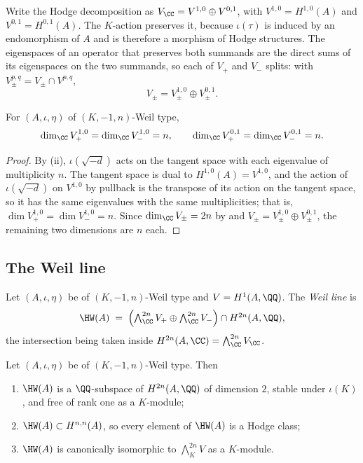 Write the Hodge decomposition as $V_{\CC}=V^{1,0}\oplus V^{0,1}$, with
$V^{1,0}=H^{1,0}(A)$ and $V^{0,1}=H^{0,1}(A)$. The $K$-action preserves it,
because $\iota(\tau)$ is induced by an endomorphism of $A$ and is therefore a
morphism of Hodge structures. The eigenspaces of an operator that preserves
both summands are the direct sums of its eigenspaces on the two summands, so
each of $V_{+}$ and $V_{-}$ splits: with $V^{p,q}_{\pm}=V_{\pm}\cap V^{p,q}$,
\begin{equation}\label{eq:bisplit}
  V_{\pm}=V_{\pm}^{1,0}\oplus V_{\pm}^{0,1}.
\end{equation}

\begin{lemma}\label{lem:balanced}
For $(A,\iota,\eta)$ of $(K,-1,n)$-Weil type,
\[
  \dim_{\CC}V_{+}^{1,0}=\dim_{\CC}V_{-}^{1,0}=n,
  \qquad
  \dim_{\CC}V_{+}^{0,1}=\dim_{\CC}V_{-}^{0,1}=n .
\]
\end{lemma}

\begin{proof}
By (ii), $\iota(\sqrt{-d})$ acts on the tangent space with
each eigenvalue of multiplicity $n$. The tangent space is dual to
$H^{1,0}(A)=V^{1,0}$, and the action of $\iota(\sqrt{-d})$ on $V^{1,0}$ by
pullback is the transpose of its action on the tangent space, so it has the
same eigenvalues with the same multiplicities; that is,
$\dim V^{1,0}_{+}=\dim V^{1,0}_{-}=n$. Since $\dim_{\CC}V_{\pm}=2n$ by
 and $V_{\pm}=V^{1,0}_{\pm}\oplus V^{0,1}_{\pm}$, the
remaining two dimensions are $n$ each.
\end{proof}

\subsection{The Weil line}

\begin{definition}\label{def:weilline}
Let $(A,\iota,\eta)$ be of $(K,-1,n)$-Weil type and $V=H^{1}(A,\QQ)$. The
\emph{Weil line} is
\[
  \HW(A)\;=\;\Bigl(\textstyle\bigwedge^{2n}_{\CC}V_{+}\oplus
  \bigwedge^{2n}_{\CC}V_{-}\Bigr)\cap H^{2n}(A,\QQ),
\]
the intersection being taken inside
$H^{2n}(A,\CC)=\bigwedge^{2n}_{\CC}V_{\CC}$.
\end{definition}

\begin{proposition}\label{prop:weilline}
Let $(A,\iota,\eta)$ be of $(K,-1,n)$-Weil type. Then
\begin{enumerate}[label=\textup{(\roman*)},nosep]
\item $\HW(A)$ is a $\QQ$-subspace of $H^{2n}(A,\QQ)$ of dimension $2$, stable
  under $\iota(K)$, and free of rank one as a $K$-module;
\item $\HW(A)\subset H^{n,n}(A)$, so every element of $\HW(A)$ is a Hodge class;
\item $\HW(A)$ is canonically isomorphic to $\bigwedge^{2n}_{K}V$ as a
  $K$-module.
\end{enumerate}
\end{proposition}


